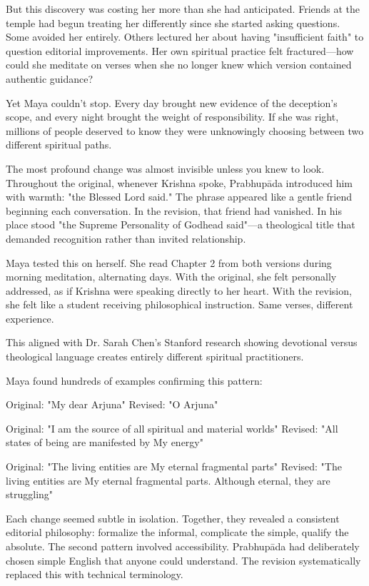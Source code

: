 \documentclass[11pt,twoside]{book}
\begin{document}
But this discovery was costing her more than she had anticipated. Friends at the temple had begun treating her differently since she started asking questions. Some avoided her entirely. Others lectured her about having "insufficient faith" to question editorial improvements. Her own spiritual practice felt fractured—how could she meditate on verses when she no longer knew which version contained authentic guidance?

Yet Maya couldn't stop. Every day brought new evidence of the deception's scope, and every night brought the weight of responsibility. If she was right, millions of people deserved to know they were unknowingly choosing between two different spiritual paths.

The most profound change was almost invisible unless you knew to look. Throughout the original, whenever Krishna spoke, Prabhupāda introduced him with warmth: "the Blessed Lord said." The phrase appeared like a gentle friend beginning each conversation. In the revision, that friend had vanished. In his place stood "the Supreme Personality of Godhead said"—a theological title that demanded recognition rather than invited relationship.

Maya tested this on herself. She read Chapter 2 from both versions during morning meditation, alternating days. With the original, she felt personally addressed, as if Krishna were speaking directly to her heart. With the revision, she felt like a student receiving philosophical instruction. Same verses, different experience.

This aligned with Dr. Sarah Chen's Stanford research showing devotional versus theological language creates entirely different spiritual practitioners.

Maya found hundreds of examples confirming this pattern:

Original: "My dear Arjuna" 
Revised: "O Arjuna"

Original: "I am the source of all spiritual and material worlds"
Revised: "All states of being are manifested by My energy"

Original: "The living entities are My eternal fragmental parts"
Revised: "The living entities are My eternal fragmental parts. Although eternal, they are struggling"

Each change seemed subtle in isolation. Together, they revealed a consistent editorial philosophy: formalize the informal, complicate the simple, qualify the absolute.
The second pattern involved accessibility. Prabhupāda had deliberately chosen simple English that anyone could understand. The revision systematically replaced this with technical terminology. 
\end{document}
